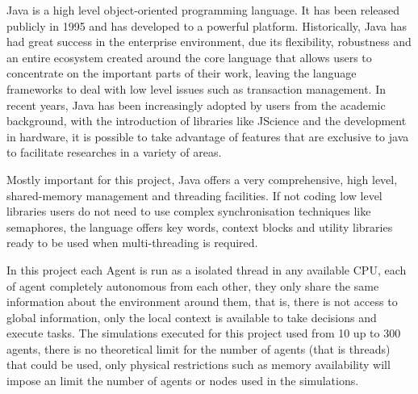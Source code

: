 Java is a high level object-oriented programming language. It has been released publicly in 1995 and has developed to a powerful platform. Historically, Java has had great success in the enterprise environment, due its flexibility, robustness and an entire ecosystem created around the core language that allows users to concentrate on the important parts of their work, leaving the language frameworks to deal with low level issues such as transaction management. In recent years, Java has been increasingly adopted by users from the academic background, with the introduction of libraries like JScience and the development in hardware, it is possible to take advantage of features that are exclusive to java to facilitate researches in a variety of areas.

Mostly important for this project, Java offers a very comprehensive, high level, shared-memory management and threading facilities. If not coding low level libraries users do not need to use complex synchronisation techniques like semaphores, the language offers key words, context blocks and utility libraries ready to be used when multi-threading is required.

In this project each Agent is run as a isolated thread in any available CPU, each of agent completely autonomous from each other, they only share the same information about the environment around them, that is, there is not access to global information, only the local context is available to take decisions and execute tasks. The simulations executed for this project used from 10 up to 300 agents, there is no theoretical limit for the number of agents (that is threads) that could be used, only physical restrictions such as memory availability will impose an limit the number of agents or nodes used in the simulations.